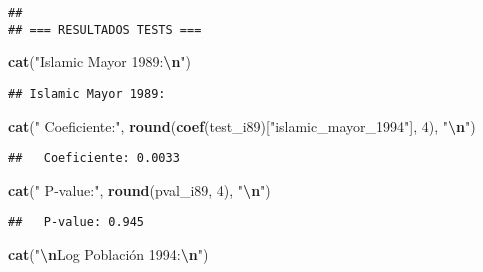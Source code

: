 \documentclass[
]{article}
\newenvironment{Shaded}{\begin{snugshade}}{\end{snugshade}}
\newcommand{\DecValTok}[1]{\textcolor[rgb]{0.00,0.00,0.81}{#1}}
\newcommand{\FunctionTok}[1]{\textcolor[rgb]{0.13,0.29,0.53}{\textbf{#1}}}
\newcommand{\NormalTok}[1]{#1}
\newcommand{\SpecialCharTok}[1]{\textcolor[rgb]{0.81,0.36,0.00}{\textbf{#1}}}
\newcommand{\StringTok}[1]{\textcolor[rgb]{0.31,0.60,0.02}{#1}}
\begin{document}
\begin{verbatim}
## 
## === RESULTADOS TESTS ===
\end{verbatim}

\begin{Shaded}
\begin{Highlighting}[]
\FunctionTok{cat}\NormalTok{(}\StringTok{"Islamic Mayor 1989:}\SpecialCharTok{\textbackslash{}n}\StringTok{"}\NormalTok{)}
\end{Highlighting}
\end{Shaded}

\begin{verbatim}
## Islamic Mayor 1989:
\end{verbatim}

\begin{Shaded}
\begin{Highlighting}[]
\FunctionTok{cat}\NormalTok{(}\StringTok{"  Coeficiente:"}\NormalTok{, }\FunctionTok{round}\NormalTok{(}\FunctionTok{coef}\NormalTok{(test\_i89)[}\StringTok{"islamic\_mayor\_1994"}\NormalTok{], }\DecValTok{4}\NormalTok{), }\StringTok{"}\SpecialCharTok{\textbackslash{}n}\StringTok{"}\NormalTok{)}
\end{Highlighting}
\end{Shaded}

\begin{verbatim}
##   Coeficiente: 0.0033
\end{verbatim}

\begin{Shaded}
\begin{Highlighting}[]
\FunctionTok{cat}\NormalTok{(}\StringTok{"  P{-}value:"}\NormalTok{, }\FunctionTok{round}\NormalTok{(pval\_i89, }\DecValTok{4}\NormalTok{), }\StringTok{"}\SpecialCharTok{\textbackslash{}n}\StringTok{"}\NormalTok{)}
\end{Highlighting}
\end{Shaded}

\begin{verbatim}
##   P-value: 0.945
\end{verbatim}

\begin{Shaded}
\begin{Highlighting}[]
\FunctionTok{cat}\NormalTok{(}\StringTok{"}\SpecialCharTok{\textbackslash{}n}\StringTok{Log Población 1994:}\SpecialCharTok{\textbackslash{}n}\StringTok{"}\NormalTok{)}
\end{Highlighting}
\end{Shaded}
\end{document}
